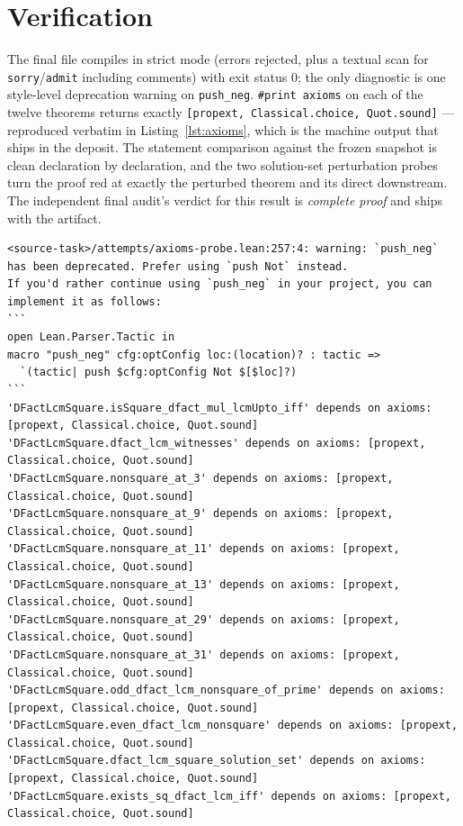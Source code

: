 \documentclass[11pt]{article}
\theoremstyle{definition}
\begin{document}
\section{Verification}\label{sec:verify}

The final file compiles in strict mode (errors rejected, plus a textual scan
for \texttt{sorry}/\texttt{admit} including comments) with exit status $0$;
the only diagnostic is one style-level deprecation warning on
\texttt{push\_neg}. \texttt{\#print axioms} on each of the twelve theorems
returns exactly \texttt{[propext, Classical.choice, Quot.sound]} ---
reproduced verbatim in Listing~\ref{lst:axioms}, which is the machine output
that ships in the deposit. The statement comparison against the frozen
snapshot is clean declaration by declaration, and the two solution-set
perturbation probes turn the proof red at exactly the perturbed theorem and
its direct downstream. The independent final audit's verdict for this result
is \emph{complete proof} and ships with the artifact.

\begin{lstlisting}[caption={Axiom printout for the three frozen statements and
the accompanying existential form (machine output, verbatim).},label={lst:axioms}]
<source-task>/attempts/axioms-probe.lean:257:4: warning: `push_neg` has been deprecated. Prefer using `push Not` instead.
If you'd rather continue using `push_neg` in your project, you can implement it as follows:
```
open Lean.Parser.Tactic in
macro "push_neg" cfg:optConfig loc:(location)? : tactic =>
  `(tactic| push $cfg:optConfig Not $[$loc]?)
```
'DFactLcmSquare.isSquare_dfact_mul_lcmUpto_iff' depends on axioms: [propext, Classical.choice, Quot.sound]
'DFactLcmSquare.dfact_lcm_witnesses' depends on axioms: [propext, Classical.choice, Quot.sound]
'DFactLcmSquare.nonsquare_at_3' depends on axioms: [propext, Classical.choice, Quot.sound]
'DFactLcmSquare.nonsquare_at_9' depends on axioms: [propext, Classical.choice, Quot.sound]
'DFactLcmSquare.nonsquare_at_11' depends on axioms: [propext, Classical.choice, Quot.sound]
'DFactLcmSquare.nonsquare_at_13' depends on axioms: [propext, Classical.choice, Quot.sound]
'DFactLcmSquare.nonsquare_at_29' depends on axioms: [propext, Classical.choice, Quot.sound]
'DFactLcmSquare.nonsquare_at_31' depends on axioms: [propext, Classical.choice, Quot.sound]
'DFactLcmSquare.odd_dfact_lcm_nonsquare_of_prime' depends on axioms: [propext, Classical.choice, Quot.sound]
'DFactLcmSquare.even_dfact_lcm_nonsquare' depends on axioms: [propext, Classical.choice, Quot.sound]
'DFactLcmSquare.dfact_lcm_square_solution_set' depends on axioms: [propext, Classical.choice, Quot.sound]
'DFactLcmSquare.exists_sq_dfact_lcm_iff' depends on axioms: [propext, Classical.choice, Quot.sound]
\end{lstlisting}
\end{document}
